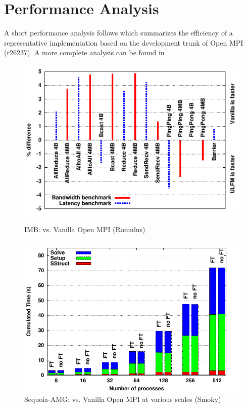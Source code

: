 \section{Performance Analysis}
\label{sect:performance}

A short performance analysis follows which summarizes the efficiency of
a representative \ulfm implementation based on the development trunk of
Open MPI (r26237). A more complete analysis
can be found in~\cite{Bland:2012tp}.

\begin{figure}
  \begin{minipage}[t]{0.48\linewidth}
 	\includegraphics[width=\linewidth]{figures/IMB.pdf}\vspace{-.4cm}
 	\caption{IMB: \ulfm vs. Vanilla Open MPI (Romulus)
 	\label{fig:IMB}}
  \end{minipage}\vspace{-.3cm}
  \hfill
  \begin{minipage}[t]{0.48\linewidth}
    \includegraphics[width=\linewidth]{figures/bargraph.pdf}\vspace{-.4cm}
    \caption{Sequoia-AMG: \ulfm vs. Vanilla Open MPI at various scales (Smoky)
    \label{fig:sequoia:bargraph}}
  \end{minipage}\vspace{-.3cm}
\end{figure}

